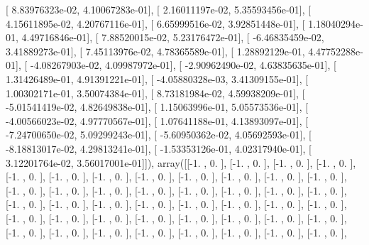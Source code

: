 \documentclass{article}
\begin{document}
       [  8.83976323e-02,   4.10067283e-01],
       [  2.16011197e-02,   5.35593456e-01],
       [  4.15611895e-02,   4.20767116e-01],
       [  6.65999516e-02,   3.92851448e-01],
       [  1.18040294e-01,   4.49716846e-01],
       [  7.88520015e-02,   5.23176472e-01],
       [ -6.46835459e-02,   3.41889273e-01],
       [  7.45113976e-02,   4.78365589e-01],
       [  1.28892129e-01,   4.47752288e-01],
       [ -4.08267903e-02,   4.09987972e-01],
       [ -2.90962490e-02,   4.63835635e-01],
       [  1.31426489e-01,   4.91391221e-01],
       [ -4.05880328e-03,   3.41309155e-01],
       [  1.00302171e-01,   3.50074384e-01],
       [  8.73181984e-02,   4.59938209e-01],
       [ -5.01541419e-02,   4.82649838e-01],
       [  1.15063996e-01,   5.05573536e-01],
       [ -4.00566023e-02,   4.97770567e-01],
       [  1.07641188e-01,   4.13893097e-01],
       [ -7.24700650e-02,   5.09299243e-01],
       [ -5.60950362e-02,   4.05692593e-01],
       [ -8.18813017e-02,   4.29813241e-01],
       [ -1.53353126e-01,   4.02317940e-01],
       [  3.12201764e-02,   3.56017001e-01]]), array([[-1.        ,  0.        ],
       [-1.        ,  0.        ],
       [-1.        ,  0.        ],
       [-1.        ,  0.        ],
       [-1.        ,  0.        ],
       [-1.        ,  0.        ],
       [-1.        ,  0.        ],
       [-1.        ,  0.        ],
       [-1.        ,  0.        ],
       [-1.        ,  0.        ],
       [-1.        ,  0.        ],
       [-1.        ,  0.        ],
       [-1.        ,  0.        ],
       [-1.        ,  0.        ],
       [-1.        ,  0.        ],
       [-1.        ,  0.        ],
       [-1.        ,  0.        ],
       [-1.        ,  0.        ],
       [-1.        ,  0.        ],
       [-1.        ,  0.        ],
       [-1.        ,  0.        ],
       [-1.        ,  0.        ],
       [-1.        ,  0.        ],
       [-1.        ,  0.        ],
       [-1.        ,  0.        ],
       [-1.        ,  0.        ],
       [-1.        ,  0.        ],
       [-1.        ,  0.        ],
       [-1.        ,  0.        ],
       [-1.        ,  0.        ],
       [-1.        ,  0.        ],
       [-1.        ,  0.        ],
       [-1.        ,  0.        ],
       [-1.        ,  0.        ],
       [-1.        ,  0.        ],
       [-1.        ,  0.        ],
       [-1.        ,  0.        ],
       [-1.        ,  0.        ],
       [-1.        ,  0.        ],
       [-1.        ,  0.        ],
       [-1.        ,  0.        ],
       [-1.        ,  0.        ],
       [-1.        ,  0.        ],
       [-1.        ,  0.        ],
\end{document}
